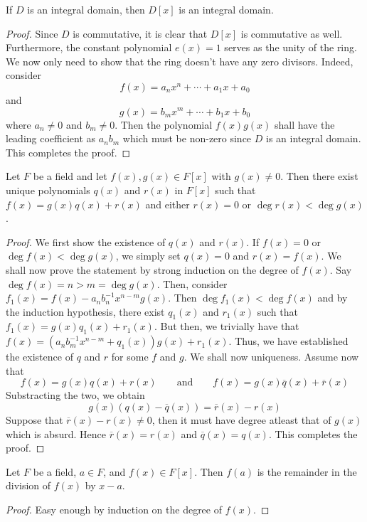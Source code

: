 \begin{proposition}
	If $D$ is an integral domain, then $D[x]$ is an integral domain.
\end{proposition}
\begin{proof}
	Since $D$ is commutative, it is clear that $D[x]$ is commutative as well. Furthermore, the constant polynomial $e(x)=1$ serves as the unity of the ring. We now only need to show that the ring doesn't have any zero divisors. Indeed, consider 
	\begin{equation*}
		f(x) = a_nx^n + \cdots + a_1x + a_0
	\end{equation*}
	and
	\begin{equation*}
		g(x) = b_mx^m + \cdots + b_1x + b_0
	\end{equation*}
	where $a_n\ne0$ and $b_m\ne0$. Then the polynomial $f(x)g(x)$ shall have the leading coefficient as $a_nb_m$ which must be non-zero since $D$ is an integral domain. This completes the proof.
\end{proof}

\begin{proposition}
	Let $F$ be a field and let $f(x),g(x)\in F[x]$ with $g(x)\ne0$. Then there exist unique polynomials $q(x)$ and $r(x)$ in $F[x]$ such that $f(x) = g(x)q(x) + r(x)$ and either $r(x)=0$ or $\deg r(x)<\deg g(x)$.
\end{proposition}
\begin{proof}
	We first show the existence of $q(x)$ and $r(x)$. If $f(x)=0$ or $\deg f(x)<\deg g(x)$, we simply set $q(x)=0$ and $r(x)=f(x)$. We shall now prove the statement by strong induction on the degree of $f(x)$. Say $\deg f(x) = n>m=\deg g(x)$. Then, consider $f_1(x) = f(x) - a_nb_n^{-1}x^{n-m}g(x)$. Then $\deg f_1(x)<\deg f(x)$ and by the induction hypothesis, there exist $q_1(x)$ and $r_1(x)$ such that $f_1(x) = g(x)q_1(x) + r_1(x)$. But then, we trivially have that $f(x) = (a_nb_m^{-1}x^{n-m}+q_1(x))g(x)+r_1(x)$. Thus, we have established the existence of $q$ and $r$ for some $f$ and $g$. We shall now uniqueness. Assume now that 
	$$
	f(x) = g(x)q(x)+r(x) \qquad \text{and} \qquad f(x) = g(x)\overline{q}(x)+\overline{r}(x)
	$$
	Substracting the two, we obtain
	$$
	g(x)\left(q(x)-\overline{q}(x)\right) = \overline{r}(x) - r(x)
	$$
	Suppose that $\overline{r}(x)-r(x)\ne0$, then it must have degree atleast that of $g(x)$ which is absurd. Hence $\overline{r}(x)=r(x)$ and $\overline{q}(x) = q(x)$. This completes the proof.
\end{proof}

\begin{corollary}
	Let $F$ be a field, $a\in F$, and $f(x)\in F[x]$. Then $f(a)$ is the remainder in the division of $f(x)$ by $x-a$.
\end{corollary}
\begin{proof}
	Easy enough by induction on the degree of $f(x)$.
\end{proof}

